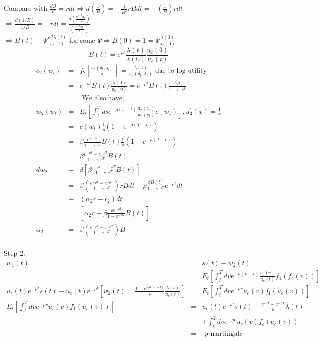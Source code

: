 \documentclass[]{article}
\begin{document}
Compare with $\frac{dB}{B}=rdt \Rightarrow d(\frac{1}{B})=-\frac{1}{B^2} r Bdt = -(\frac{1}{B})rdt$\\
$\Rightarrow \frac{d(1/B)}{1/B} = -rdt = \frac{d\left(\frac{e^{-\rho t} u_c}{\lambda}\right)}{\left(\frac{e^{-\rho t} u_c}{\lambda}\right)}$\\
$\Rightarrow B(t) - \Psi \frac{e^{\rho t} \lambda(t)}{u_c(t)}$ for some $\Psi \Rightarrow B(0) = 1 = \Psi \frac{\lambda(0)}{u_c(0)}$\\
\begin{equation}
B(t) = e^{\rho t} \frac{\lambda(t)}{\lambda(0)} \frac{u_c(0)}{u_c(t)} \tag{36}
\end{equation}
\begin{eqnarray*}
c_2^\prime(w_t) &=& f_2\left[\frac{u_c(\delta_t,\lambda_t)}{\lambda_t}\right] = \frac{\lambda(t)}{u_c(\delta_t,\lambda_t)} \mbox{  due to log utility}\\
&=& e^{-\rho t} B(t) \frac{\lambda(0)}{u_c(0)} = e^{-\rho t} B(t) \frac{\beta \rho}{1-e^{-\rho t}}\\
&& \mbox{ We also have,}\\
w_2(w_t) &=& E_t\left[\int_t^T ds e^{-\rho(s-t)} \frac{u_2^\prime(c_s)}{u_2^\prime(c_t)} c(w_s)\right], u_2^\prime(x) = \frac{1}{x}\\
&=& c(w_t) \frac{1}{\rho} (1-e^{-\rho(T-t)})\\
&=& \beta \frac{\rho e^{-\rho t}}{1-e^{-\rho t}} B(t) \frac{1}{\rho} (1-e^{-\rho(T-t)})\\
&=& \beta \frac{e^{-\rho t}-e^{-\rho T}}{1-e^{-\rho T}} B(t)\\
dw_2 &=& d\left[\beta \frac{e^{-\rho t} - e^{-\rho T}}{1-e^{-\rho T}} B(t)\right]\\
&=& \beta \left(\frac{e^{-\rho t} - e^{-\rho T}}{1-e^{-\rho T}}\right) r Bdt - \rho \frac{\beta B(t)}{1-e^{-\rho T}} e^{-\rho t} dt\\
&\equiv & (\alpha_2 r-c_2)dt\\
&=& \left[\alpha_2 r - \beta \frac{\rho e^{-\rho t}}{1-e^{-\rho T}} B(t)\right]\\
\alpha_2 &=& \beta \left(\frac{e^{-\rho t} - e^{-\rho T}}{1-e^{-\rho T}}\right) B\\
\end{eqnarray*}

Step 2:
\begin{eqnarray*}
w_1(t) &=& s(t) - w_2(t) \\
&=& E_t \left[\int_t^T dv e^{-\rho (v-t)} \frac{u_c(v)}{u_c(t)} f_1(f_c(v))\right]\\
u_c(t) e^{-\rho t} s(t) - u_c(t) e^{-\rho t} \left[w_2(t) = \frac{1-e^{-\rho (T-t)}}{\rho} \frac{\lambda(t)}{u_c(t)}\right] &=& E_t\left[\int_t^T dv e^{-\rho v} u_c(v) f_1(u_c(v))\right]\\
E_t\left[\int_t^T dv e^{-\rho v} u_c(v) f_1(u_c(v))\right] &=& u_c(t) e^{-\rho t} s(t) - \frac{e^{-\rho t} - e^{-\rho T}}{\rho} \lambda(t) \\
&& + \int_0^T dv e^{-\rho v} u_c(v) f_c(u_c(v))\\
&=& \mbox{ p-martingale}
\end{eqnarray*}
\end{document}
